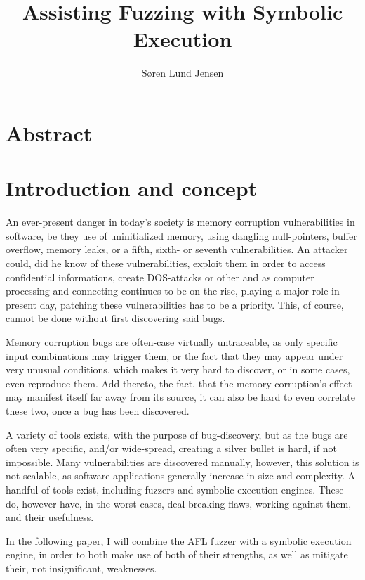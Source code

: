 \documentclass[a4paper]{article}
\title{Assisting Fuzzing with Symbolic Execution}
\author{Søren Lund Jensen}
\begin{document}
\maketitle %

\tableofcontents

\newpage
\section{Abstract}

\newpage
\section{Introduction and concept}
An ever-present danger in today's society is memory corruption vulnerabilities in software, be they use of uninitialized memory, using dangling null-pointers, buffer overflow, memory leaks, or a fifth, sixth- or seventh vulnerabilities. An attacker could, did he know of these vulnerabilities, exploit them in order to access confidential informations, create DOS-attacks or other and as computer processing and connecting continues to be on the rise, playing a major role in present day, patching these vulnerabilities has to be a priority. This, of course, cannot be done without first discovering said bugs. 

Memory corruption bugs are often-case virtually untraceable, as only specific input combinations may trigger them, or the fact that they may appear under very unusual conditions, which makes it very hard to discover, or in some cases, even reproduce them. Add thereto, the fact, that the memory corruption's effect may manifest itself far away from its source, it can also be hard to even correlate these two, once a bug has been discovered.

A variety of tools exists, with the purpose of bug-discovery, but as the bugs are often very specific, and/or wide-spread, creating a silver bullet is hard, if not impossible. Many vulnerabilities are discovered manually, however, this solution is not scalable, as software applications generally increase in size and complexity. A handful of tools exist, including fuzzers and symbolic execution engines. These do, however have, in the worst cases, deal-breaking flaws, working against them, and their usefulness.

In the following paper, I will combine the AFL fuzzer with a symbolic execution engine, in order to both make use of both of their strengths, as well as mitigate their, not insignificant, weaknesses.
\end{document}
